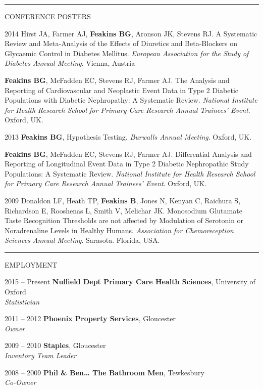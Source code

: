 \documentclass[10pt,a4paper]{article}
\begin{document}
\noindent\rule{\textwidth}{0.4pt}
\begin{cvlist}{CONFERENCE POSTERS}
  
  \item[2014]
  Hirst JA, Farmer AJ, \textbf{Feakins BG}, Aronson JK, Stevens RJ. A Systematic Review and Meta-Analysis of the Effects of Diuretics and Beta-Blockers on Glycaemic Control in Diabetes Mellitus. \textit{European Association for the Study of Diabetes Annual Meeting}. Vienna, Austria
  
  \item[]
  \textbf{Feakins BG}, McFadden EC, Stevens RJ, Farmer AJ. The Analysis and Reporting of Cardiovascular and Neoplastic Event Data in Type 2 Diabetic Populations with Diabetic Nephropathy: A Systematic Review. \textit{National Institute for Health Research School for Primary Care Research Annual Trainees' Event}. Oxford, UK.
  
  \item[2013]
  \textbf{Feakins BG}, Hypothesis Testing. \textit{Burwalls Annual Meeting}. Oxford, UK.
  
  \item[]
  \textbf{Feakins BG}, McFadden EC, Stevens RJ, Farmer AJ. Differential Analysis and Reporting of Longitudinal Event Data in Type 2 Diabetic Nephropathic Study Populations: A Systematic Review. \textit{National Institute for Health Research School for Primary Care Research Annual Trainees' Event}. Oxford, UK.
  
  \item[2009]
  Donaldon LF, Heath TP, \textbf{Feakins B}, Jones N, Kenyan C, Raichura S, Richardson E, Rooshenas L, Smith V, Melichar JK. Monosodium Glutamate Taste Recognition Thresholds are not affected by Modulation of Serotonin or Noradrenaline Levels in Healthy Humans. \textit{Association for Chemoreception Sciences Annual Meeting}. Sarasota. Florida, USA.
  
\end{cvlist}


\noindent\rule{\textwidth}{0.4pt}
\begin{cvlist}{EMPLOYMENT}
  
  \item[2015 -- Present]
  \textbf{Nuffield Dept Primary Care Health Sciences}, University of Oxford \\
  \textit{Statistician}
  
  \item[2011 -- 2012]
  \textbf{Phoenix Property Services}, Gloucester \\
  \textit{Owner}
  
  \item[2009 -- 2010]
  \textbf{Staples}, Gloucester \\
  \textit{Inventory Team Leader}
  
  \item[2008 -- 2009]
  \textbf{Phil \& Ben… The Bathroom Men}, Tewkesbury \\
  \textit{Co-Owner}
  
\end{cvlist}
\end{document}
